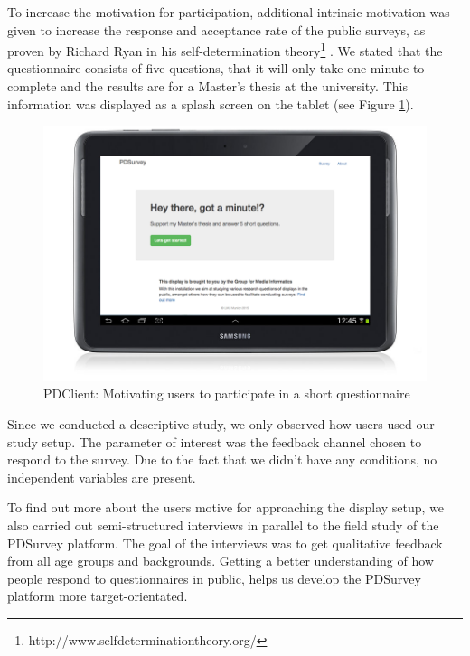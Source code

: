 	To increase the motivation for participation, additional intrinsic motivation was given to increase the response and acceptance rate of the public surveys, as proven by Richard Ryan in his self-determination theory\footnote{http://www.selfdeterminationtheory.org/} \cite{ryan2000self}. We stated that the questionnaire consists of five questions, that it will only take one minute to complete and the results are for a Master's thesis at the university. This information was displayed as a splash screen on the tablet (see Figure \ref{fig:5-pdclient-intro}).

	\begin{figure}
	    \begin{center}
	        \includegraphics[width=.7\columnwidth]{img/5_field-study/pdclient-startscreen.png}
	    \end{center}
	 \caption{PDClient: Motivating users to participate in a short questionnaire}
	 \label{fig:5-pdclient-intro}
	\end{figure}

	Since we conducted a descriptive study, we only observed how users used our study setup. The parameter of interest was the feedback channel chosen to respond to the survey. Due to the fact that we didn't have any conditions, no independent variables are present.


	To find out more about the users motive for approaching the display setup, we also carried out semi-structured interviews in parallel to the field study of the PDSurvey platform. The goal of the interviews was to get qualitative feedback from all age groups and backgrounds. Getting a better understanding of how people respond to questionnaires in public, helps us develop the PDSurvey platform more target-orientated.




